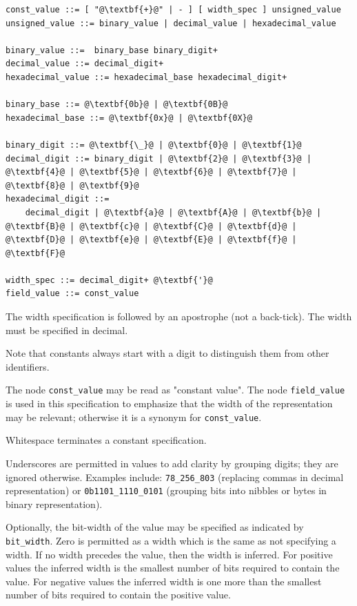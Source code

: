 \documentclass[12pt]{article}
\begin{document}
\begin{lstlisting}[frame=single,backgroundcolor=\color{bnfgreen},escapechar=\@]
const_value ::= [ "@\textbf{+}@" | - ] [ width_spec ] unsigned_value
unsigned_value ::= binary_value | decimal_value | hexadecimal_value

binary_value ::=  binary_base binary_digit+
decimal_value ::= decimal_digit+
hexadecimal_value ::= hexadecimal_base hexadecimal_digit+

binary_base ::= @\textbf{0b}@ | @\textbf{0B}@
hexadecimal_base ::= @\textbf{0x}@ | @\textbf{0X}@

binary_digit ::= @\textbf{\_}@ | @\textbf{0}@ | @\textbf{1}@
decimal_digit ::= binary_digit | @\textbf{2}@ | @\textbf{3}@ | @\textbf{4}@ | @\textbf{5}@ | @\textbf{6}@ | @\textbf{7}@ | @\textbf{8}@ | @\textbf{9}@
hexadecimal_digit ::= 
    decimal_digit | @\textbf{a}@ | @\textbf{A}@ | @\textbf{b}@ | @\textbf{B}@ | @\textbf{c}@ | @\textbf{C}@ | @\textbf{d}@ | @\textbf{D}@ | @\textbf{e}@ | @\textbf{E}@ | @\textbf{f}@ | @\textbf{F}@

width_spec ::= decimal_digit+ @\textbf{'}@
field_value ::= const_value
\end{lstlisting}

The width specification is followed by an apostrophe (not a back-tick). The 
width must be specified in decimal.

Note that constants always start with a digit to distinguish them from other 
identifiers.

The node \texttt{const_value} may be read as "constant value". The node \texttt{field_value} is 
used in this specification to emphasize that the width of the representation 
may be relevant; otherwise it is a synonym for \texttt{const_value}.

Whitespace terminates a constant specification.

Underscores are permitted in values to add clarity by grouping digits; they 
are ignored otherwise.  Examples include: \texttt{78_256_803} (replacing commas 
in decimal representation) or \texttt{0b1101_1110_0101} (grouping bits into nibbles 
or bytes in binary representation).

Optionally, the bit-width of the value may be specified as indicated
by \texttt{bit_width}.  Zero is permitted as a width which is the
same as not specifying a width.  If no width precedes the value, then
the width is inferred. For positive values the inferred width is the
smallest number of bits required to contain the value. For negative
values the inferred width is one more than the smallest number of bits
required to contain the positive value.
\end{document}
